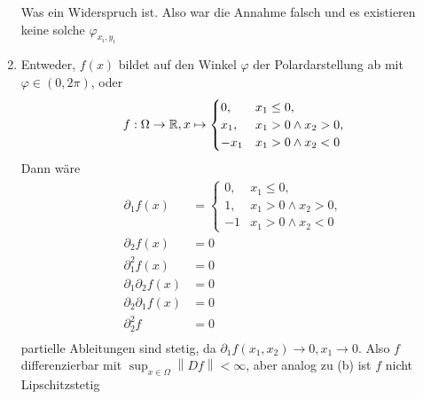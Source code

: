 \documentclass[sectionformat=aufgabe]{gadsescript}
\begin{document}
\begin{enumerate}[label=(\alph*)]
\[		\]
		Was ein Widerspruch ist.
		Also war die Annahme falsch und es existieren keine solche $ \varphi_{x_i, y_i}  $
	\item Entweder, $ f(x) $ bildet auf den Winkel $ \varphi $ der Polardarstellung ab mit $ \varphi \in (0, 2 \pi ) $, oder
		\[
			f: \Omega \to \mathbb{R} , x \mapsto 
			\begin{cases}
				0, & x_1 \leq 0, \\
				x_1, & x_1 > 0 \wedge x_2 > 0, \\
				-x_1 & x_1 > 0 \wedge x_2 < 0
			\end{cases}
		\]
		Dann wäre
		\begin{align*}
			\partial_1 f(x) &= \begin{cases}
				0, & x_1 \leq 0, \\
				1, & x_1 > 0 \wedge x_2 > 0,\\
				-1 & x_1 > 0 \wedge x_2 < 0
			\end{cases} \\
			\partial_2 f(x) &= 0 \\
			\partial_1^2 f(x) &= 0 \\
			\partial_1\partial_2 f(x) &= 0 \\
			\partial_2\partial_1 f(x) &= 0 \\
			\partial_2^2 f &= 0 \\
		\end{align*}
		partielle Ableitungen sind stetig, da $ \partial_1 f(x_1, x_2) \to 0, x_1 \to 0 $.
		Also $ f $ differenzierbar mit $ \sup_{x \in \Omega} \left\| Df \right\| < \infty $, aber analog zu (b) ist $ f $ nicht Lipschitzstetig
\end{enumerate}
\end{document}
